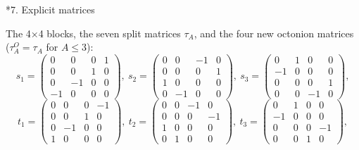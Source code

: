 \documentclass[10pt,a4paper]{article}
\makeatletter
\renewcommand\section{\@startsection{section}{1}{\z@}{-3.5ex \@plus -1ex \@minus -.2ex}{2.3ex \@plus.2ex}{\normalfont\Large\bfseries\raggedright}}
\makeatother
\begin{document}
\section*{7. Explicit matrices}
The 4×4 blocks, the seven split matrices $\tau_A$, and the four new octonion matrices ($\tau^{O}_A=\tau_A$ for $A\le3$):
\begin{equation*}
s_1=\begin{pmatrix}0 & 0 & 0 & 1 \\ 0 & 0 & 1 & 0 \\ 0 & -1 & 0 & 0 \\ -1 & 0 & 0 & 0\end{pmatrix},\ s_2=\begin{pmatrix}0 & 0 & -1 & 0 \\ 0 & 0 & 0 & 1 \\ 1 & 0 & 0 & 0 \\ 0 & -1 & 0 & 0\end{pmatrix},\ s_3=\begin{pmatrix}0 & 1 & 0 & 0 \\ -1 & 0 & 0 & 0 \\ 0 & 0 & 0 & 1 \\ 0 & 0 & -1 & 0\end{pmatrix},
\end{equation*}
\begin{equation*}
t_1=\begin{pmatrix}0 & 0 & 0 & -1 \\ 0 & 0 & 1 & 0 \\ 0 & -1 & 0 & 0 \\ 1 & 0 & 0 & 0\end{pmatrix},\ t_2=\begin{pmatrix}0 & 0 & -1 & 0 \\ 0 & 0 & 0 & -1 \\ 1 & 0 & 0 & 0 \\ 0 & 1 & 0 & 0\end{pmatrix},\ t_3=\begin{pmatrix}0 & 1 & 0 & 0 \\ -1 & 0 & 0 & 0 \\ 0 & 0 & 0 & -1 \\ 0 & 0 & 1 & 0\end{pmatrix},
\end{equation*}
\end{document}
